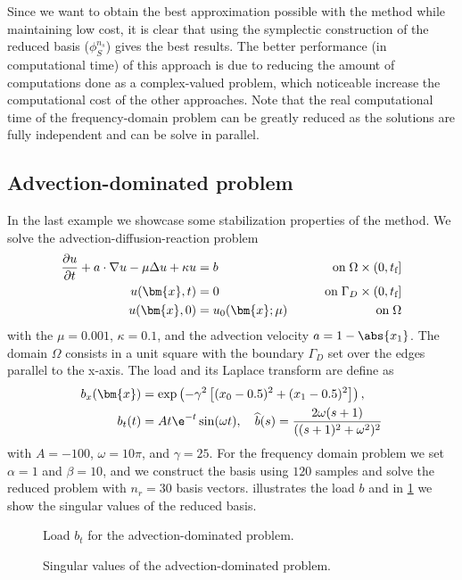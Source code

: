 Since we want to obtain the best approximation possible with the method while maintaining low cost, it is clear that using the symplectic construction of the reduced basis ($\phi_{S}^{n_s}$) gives the best results.
The better performance (in computational time) of this approach is due to reducing the amount of computations done as a complex-valued problem, which noticeable increase the computational cost of the other approaches.
Note that the real computational time of the frequency-domain problem can be greatly reduced as the solutions are fully independent and can be solve in parallel.



\subsection{Advection-dominated problem} \label{ssec:CDR}

In the last example we showcase some stabilization properties of the method. We solve the advection-diffusion-reaction problem
\begin{alignat}{2} \label{eq:advection}
    \frac{\partial{u}}{\partial{t}} + a \cdot \nabla u - \mu \Delta u + \kappa u &= b &\qquad \text{on} \; \Omega \times (0,t_{\textnormal{f}}] \\
    u(\bm{x},t) &= 0 &\qquad \text{on} \; \Gamma_D \times (0,t_{\textnormal{f}}] \\
    u(\bm{x},0) &= u_0(\bm{x};\mu) &\qquad \text{on} \; \Omega
\end{alignat}
with the $\mu=0.001$, $\kappa=0.1$, and the advection velocity $a=1-\abs{x_1}$. The domain $\Omega$ consists in a unit square with the boundary $\Gamma_D$ set over the edges parallel to the x-axis. The load and its Laplace transform are define as
\begin{align}
    b_x(\bm{x}) &= \exp \left(-\gamma^2 \left[(x_0-0.5)^2 + (x_1-0.5)^2 \right] \right), \\
    b_t(t) &= A t\e^{-t}\sin(\omega t), \quad \widehat{b}(s) = \frac{2\omega (s+1)}{((s+1)^2+\omega^2)^2}
\end{align}
with $A=-100$, $\omega=10\pi$, and $\gamma=25$. For the frequency domain problem we set $\alpha=1$ and $\beta=10$, and we construct the basis using $120$ samples and solve the reduced problem with $n_r=30$ basis vectors.  illustrates the load $b$ and in \cref{fig:adv-basisS} we show the singular values of the reduced basis. 
\begin{figure}[H]
\RawFloats
\begin{minipage}[t]{.49\textwidth}
	
	\caption{Load $b_t$ for the advection-dominated problem.} 
	\label{fig:adv-load}
\end{minipage}\hfill%
\begin{minipage}[t]{.49\textwidth}
	
	\caption{Singular values of the advection-dominated problem.} 
	\label{fig:adv-basisS}
\end{minipage}
\end{figure}

